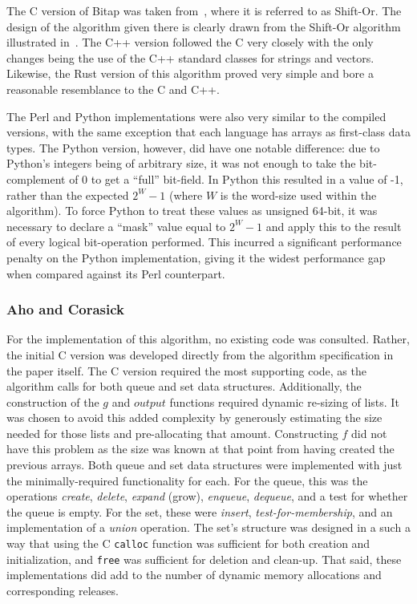 The C version of Bitap was taken from~\cite[Chapter 5]{handbook}, where it is referred to as Shift-Or. The design of the algorithm given there is clearly drawn from the Shift-Or algorithm illustrated in~\cite{baeza}. The C++ version followed the C very closely with the only changes being the use of the C++ standard classes for strings and vectors. Likewise, the Rust version of this algorithm proved very simple and bore a reasonable resemblance to the C and C++.

The Perl and Python implementations were also very similar to the compiled versions, with the same exception that each language has arrays as first-class data types. The Python version, however, did have one notable difference: due to Python's integers being of arbitrary size, it was not enough to take the bit-complement of 0 to get a ``full'' bit-field. In Python this resulted in a value of -1, rather than the expected $2^W - 1$ (where $W$ is the word-size used within the algorithm). To force Python to treat these values as unsigned 64-bit, it was necessary to declare a ``mask'' value equal to $2^W - 1$ and apply this to the result of every logical bit-operation performed. This incurred a significant performance penalty on the Python implementation, giving it the widest performance gap when compared against its Perl counterpart.

\subsubsection{Aho and Corasick}

For the implementation of this algorithm, no existing code was consulted. Rather, the initial C version was developed directly from the algorithm specification in the paper itself. The C version required the most supporting code, as the algorithm calls for both queue and set data structures. Additionally, the construction of the $g$ and $output$ functions required dynamic re-sizing of lists. It was chosen to avoid this added complexity by generously estimating the size needed for those lists and pre-allocating that amount. Constructing $f$ did not have this problem as the size was known at that point from having created the previous arrays. Both queue and set data structures were implemented with just the minimally-required functionality for each. For the queue, this was the operations \textit{create}, \textit{delete}, \textit{expand} (grow), \textit{enqueue}, \textit{dequeue}, and a test for whether the queue is empty. For the set, these were \textit{insert}, \textit{test-for-membership}, and an implementation of a \textit{union} operation. The set's structure was designed in a such a way that using the C \texttt{calloc} function was sufficient for both creation and initialization, and \texttt{free} was sufficient for deletion and clean-up. That said, these implementations did add to the number of dynamic memory allocations and corresponding releases.

